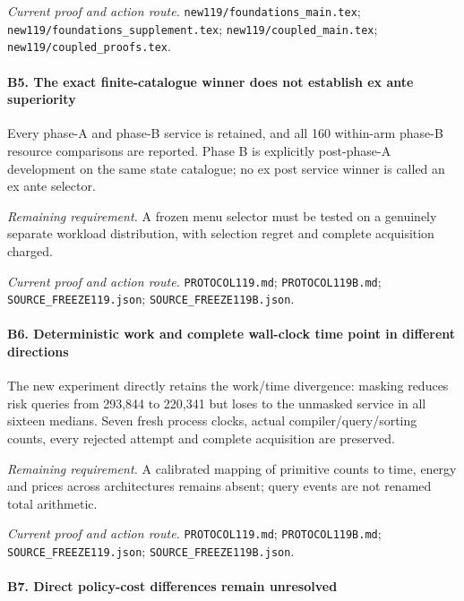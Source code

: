 \par\emph{Current proof and action route.} \nolinkurl{new119/foundations_main.tex}; \nolinkurl{new119/foundations_supplement.tex}; \nolinkurl{new119/coupled_main.tex}; \nolinkurl{new119/coupled_proofs.tex}.

\paragraph{B5. The exact finite-catalogue winner does not establish ex ante superiority}

Every phase-A and phase-B service is retained, and all 160 within-arm phase-B resource comparisons are reported. Phase B is explicitly post-phase-A development on the same state catalogue; no ex post service winner is called an ex ante selector.

\par\emph{Remaining requirement.} A frozen menu selector must be tested on a genuinely separate workload distribution, with selection regret and complete acquisition charged.

\par\emph{Current proof and action route.} \nolinkurl{PROTOCOL119.md}; \nolinkurl{PROTOCOL119B.md}; \nolinkurl{SOURCE_FREEZE119.json}; \nolinkurl{SOURCE_FREEZE119B.json}.

\paragraph{B6. Deterministic work and complete wall-clock time point in different directions}

The new experiment directly retains the work/\allowbreak{}time divergence: masking reduces risk queries from 293,844 to 220,341 but loses to the unmasked service in all sixteen medians. Seven fresh process clocks, actual compiler/\allowbreak{}query/\allowbreak{}sorting counts, every rejected attempt and complete acquisition are preserved.

\par\emph{Remaining requirement.} A calibrated mapping of primitive counts to time, energy and prices across architectures remains absent; query events are not renamed total arithmetic.

\par\emph{Current proof and action route.} \nolinkurl{PROTOCOL119.md}; \nolinkurl{PROTOCOL119B.md}; \nolinkurl{SOURCE_FREEZE119.json}; \nolinkurl{SOURCE_FREEZE119B.json}.

\paragraph{B7. Direct policy-cost differences remain unresolved}

